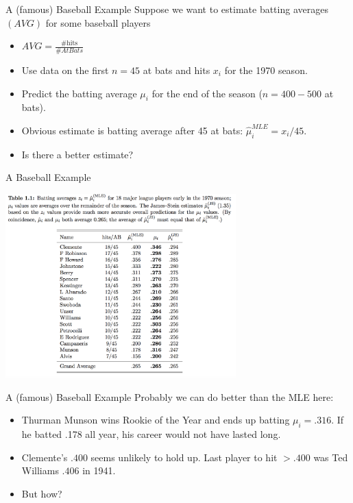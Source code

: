 \documentclass[xcolor=pdftex,dvipsnames,table,mathserif,aspectratio=169]{beamer}
\begin{document}
\begin{frame}[fragile]{A (famous) Baseball Example}
Suppose we want to estimate batting averages $(AVG)$ for some baseball players
\begin{itemize}
\item $AVG = \frac{\# \text{hits}}{ \# At Bats}$
\item Use data on the first $n=45$ at bats and hits $x_i$ for the 1970 season.
\item Predict the batting average $\mu_i$ for the end of the season  ($n=400-500$ at bats).
\item Obvious estimate is batting average after 45 at bats: $\widehat{\mu}_i^{MLE}= x_i/45$.
\item Is there a better estimate?
\end{itemize}
\end{frame}


\begin{frame}[fragile]{A Baseball Example}
\begin{center}
\includegraphics[width=3.5in]{./resources/baseball.png}
\end{center}
\end{frame}

\begin{frame}[fragile]{A (famous) Baseball Example}
Probably we can do better than the MLE here:
\begin{itemize}
\item Thurman Munson wins Rookie of the Year and ends up batting $\mu_i = .316$. If he batted .178 all year, his career would not have lasted long.
\item Clemente's $.400$ seems unlikely to hold up. Last player to hit $> .400$ was Ted Williams $.406$ in 1941.
\item But how?
\end{itemize}
\end{frame}
\end{document}
